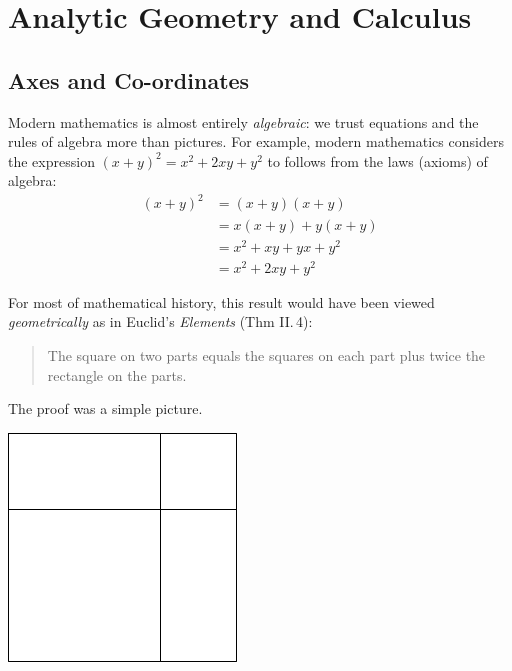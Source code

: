 \graphicspath{{8analytic/pics/}}
\section{Analytic Geometry and Calculus}

\subsection{Axes and Co-ordinates}

Modern mathematics is almost entirely \emph{algebraic}: we trust equations and the rules of algebra more than pictures. For example, modern mathematics considers the expression $(x+y)^2=x^2+2xy+y^2$ to follows from the laws (axioms) of algebra:
\begin{align*}
(x+y)^2&=(x+y)(x+y)\tag*{(definition of `square')}\\
&=x(x+y)+y(x+y)\tag*{(distributive law)}\\
&=x^2+xy+yx+y^2\tag*{(distributive law twice more)}\\
&=x^2+2xy+y^2\tag*{(commutativity)}
\end{align*}
\begin{minipage}[t]{0.72\linewidth}\vspace{0pt}
	For most of mathematical history, this result would have been viewed \emph{geometrically} as in Euclid's \emph{Elements} (Thm II.\,4):
	\begin{quote}
	The square on two parts equals the squares on each part plus twice the rectangle on the parts.
	\end{quote}
	The proof was a simple picture.
\end{minipage}\hfill\begin{minipage}[t]{0.25\linewidth}\vspace{0pt}
	\flushright\includegraphics{analytic-euclid}
\end{minipage}\smallbreak

